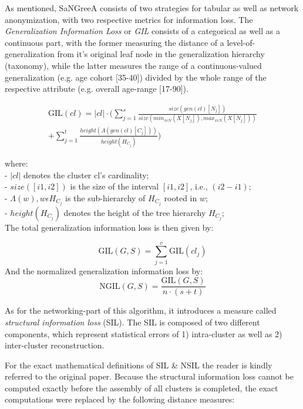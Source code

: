 \documentclass{llncs}
\providecommand{\abs}[1]{\lvert#1\rvert}
\begin{document}
As mentioned, SaNGreeA consists of two strategies for tabular as well as network anonymization, with two respective metrics for information loss. The \textit{Generalization Information Loss} or \emph{GIL} consists of a categorical as well as a continuous part, with the former measuring the distance of a level-of-generalization from it's original leaf node in the generalization hierarchy (taxonomy), while the latter measures the range of a continuous-valued generalization (e.g. age cohort [35-40]) divided by the whole range of the respective attribute (e.g. overall age-range [17-90]).


\begin{equation*}
\begin{split}
\text{GIL}(cl) = \abs{cl} \cdot (\sum_{j=1}^{s} \frac{size(gen(cl)[N_j])}{size(min_{x \epsilon N} (X[N_j]), max_{x \epsilon N} (X[N_j]))} \\ 
+ \sum_{j=1}^{t} \frac{height(\Lambda(gen(cl)[C_j]))}{height(H_{C_j})})    
\end{split}
\end{equation*}


where:\\
- $\abs{cl}$ denotes the cluster cl's cardinality; \\
- $size([i1,i2])$ is the size of the interval $[i1,i2]$, i.e., $(i2-i1)$; \\
- $\Lambda(w), w \epsilon H_{C_j}$ is the sub-hierarchy of $H_{C_j}$ rooted in $w$; \\
- $height(H_{C_j})$ denotes the height of the tree hierarchy $H_{C_j}$; \\


The total generalization information loss is then given by:

\begin{equation*}
\text{GIL}(G,S) = \sum_{j=1}^{v} \text{GIL}(cl_j)
\end{equation*}
And the normalized generalization information loss by:
\begin{equation*}
\text{NGIL}(G,S) = \frac{\text{GIL}(G,S)}{n \cdot (s+t)}
\end{equation*}


As for the networking-part of this algorithm, it introduces a measure called \textit{structural information loss} (SIL). The SIL is composed of two different components, which represent statistical errors of 1) intra-cluster as well as 2) inter-cluster reconstruction.

For the exact mathematical definitions of SIL \& NSIL the reader is kindly referred to the original paper. Because the structural information loss cannot be computed exactly before the assembly of all clusters is completed, the exact computations were replaced by the following distance measures: \\
\end{document}

